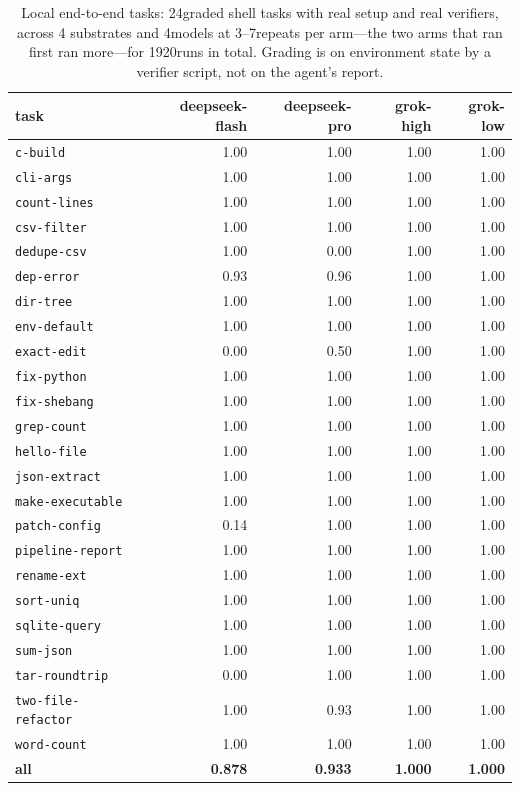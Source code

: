 \documentclass[11pt,a4paper]{article}
\begin{document}
\begin{table}[h]\centering\small
\caption{Local end-to-end tasks: 24graded shell tasks with real
setup and real verifiers, across 4 substrates and 4models at
3--7repeats per arm---the two arms that ran first ran more---for
1920runs in total. Grading is on environment state
by a verifier script, not on the agent's report.}
\label{tab:localtask}
\begin{tabular}{lrrrr}
\toprule
task & deepseek-flash & deepseek-pro & grok-high & grok-low \\
\midrule
\texttt{c-build} & 1.00 & 1.00 & 1.00 & 1.00 \\
\texttt{cli-args} & 1.00 & 1.00 & 1.00 & 1.00 \\
\texttt{count-lines} & 1.00 & 1.00 & 1.00 & 1.00 \\
\texttt{csv-filter} & 1.00 & 1.00 & 1.00 & 1.00 \\
\texttt{dedupe-csv} & 1.00 & 0.00 & 1.00 & 1.00 \\
\texttt{dep-error} & 0.93 & 0.96 & 1.00 & 1.00 \\
\texttt{dir-tree} & 1.00 & 1.00 & 1.00 & 1.00 \\
\texttt{env-default} & 1.00 & 1.00 & 1.00 & 1.00 \\
\texttt{exact-edit} & 0.00 & 0.50 & 1.00 & 1.00 \\
\texttt{fix-python} & 1.00 & 1.00 & 1.00 & 1.00 \\
\texttt{fix-shebang} & 1.00 & 1.00 & 1.00 & 1.00 \\
\texttt{grep-count} & 1.00 & 1.00 & 1.00 & 1.00 \\
\texttt{hello-file} & 1.00 & 1.00 & 1.00 & 1.00 \\
\texttt{json-extract} & 1.00 & 1.00 & 1.00 & 1.00 \\
\texttt{make-executable} & 1.00 & 1.00 & 1.00 & 1.00 \\
\texttt{patch-config} & 0.14 & 1.00 & 1.00 & 1.00 \\
\texttt{pipeline-report} & 1.00 & 1.00 & 1.00 & 1.00 \\
\texttt{rename-ext} & 1.00 & 1.00 & 1.00 & 1.00 \\
\texttt{sort-uniq} & 1.00 & 1.00 & 1.00 & 1.00 \\
\texttt{sqlite-query} & 1.00 & 1.00 & 1.00 & 1.00 \\
\texttt{sum-json} & 1.00 & 1.00 & 1.00 & 1.00 \\
\texttt{tar-roundtrip} & 0.00 & 1.00 & 1.00 & 1.00 \\
\texttt{two-file-refactor} & 1.00 & 0.93 & 1.00 & 1.00 \\
\texttt{word-count} & 1.00 & 1.00 & 1.00 & 1.00 \\
\textbf{all} & \textbf{0.878} & \textbf{0.933} & \textbf{1.000} & \textbf{1.000} \\
\bottomrule
\end{tabular}
\end{table}
\end{document}
